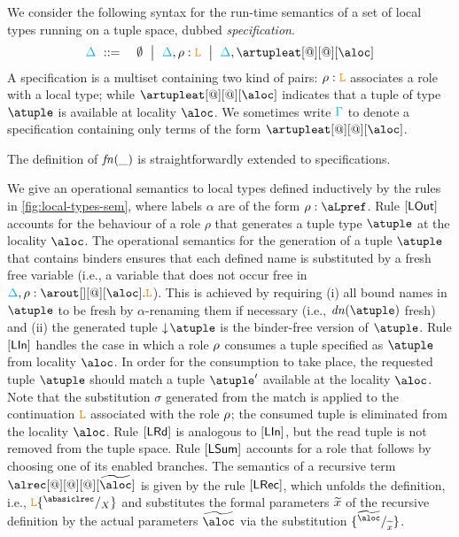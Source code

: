 We consider the following syntax for the run-time semantics of a set
of local types running on a tuple space, dubbed \emph{specification}.
%
\begin{eqnarray*}
  \envmv & \bnfdef & \emptyset \bnfmid
                  \envmv, \arole :  \aL \bnfmid
                  \envmv, \artupleat[@][@][\aloc]                  
\end{eqnarray*}
%
%
A specification is a multiset containing two kind of pairs:
$\rho : \texttt{\textcolor{orange}L}$ associates a role with a local type; while $\artupleat[@][@][\aloc]$
indicates that a tuple of type $\atuple$ is available at locality
$\aloc$.
%
We sometimes write $\textcolor{cyan}{\Gamma}$ to denote a specification containing only
terms of the form $\artupleat[@][@][\aloc]$. 

The definition of ${\it fn}(\_)$ is straightforwardly  extended to specifications. 

We give an operational semantics to local types defined inductively by 
the rules in \cref{fig:local-types-sem}, where labels $\alpha$ are of the form 
$\arole : \aLpref$. Rule $\mathsf{[LOut]}$ 
accounts  for the behaviour of a role $\rho$ that  generates a tuple type $\atuple$ at the 
locality $\aloc$. The operational semantics for the generation of a tuple $\atuple$ that 
contains binders ensures that  each defined name  is substituted by a fresh free variable 
 (i.e., a variable that does not occur free in $\envmv, \arole : \arout[][@][\aloc].\aL$).
This is achieved by requiring  (i) all bound names in $\atuple$ to be fresh by $\alpha$-renaming them if necessary (i.e., $\dn\atuple$  fresh) and 
(ii)  the generated tuple $\eraseB\atuple$ is the binder-free version of $\atuple$. 
Rule $\mathsf{[LIn]}$ handles the case in which a role $\rho$
consumes  a tuple specified as $\atuple$ from locality $\aloc$. In order for the consumption to
take place, the  requested tuple $\atuple$ should match  a tuple $\atuple'$ available 
at the locality $\aloc$. 
Note that the substitution $\sigma$ generated from the match is applied 
to the continuation $\texttt{\textcolor{orange}L}$ associated with the role $\rho$; the
consumed tuple is eliminated from the locality $\aloc$. 
%
Rule $\mathsf{[LRd]}$ is analogous to $\mathsf{[LIn]}$, but the 
read tuple is not removed from the tuple space.
%
Rule $\mathsf{[LSum]}$ accounts for a role that follows by choosing one of 
its enabled branches. 
%
The semantics of a recursive term $\alrec[@][@][@][\seq \aloc]$ is
given by the rule $\mathsf{[LRec]}$, which unfolds the definition,
i.e., $\aL\sust X{\abasiclrec}$ and substitutes the formal parameters
$\widetilde{x}$ of the recursive definition by the actual parameters
$\seq\aloc$ via the substitution
$\sust {\seq x}{\seq \aloc}$.
 


